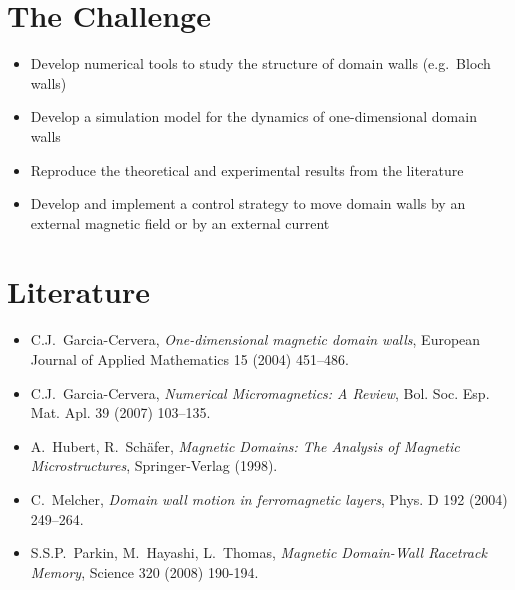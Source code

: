 \documentclass[english,pagenumoff]{rwth-document}
\begin{document}
\section*{The Challenge}
%
\begin{itemize}
\item Develop numerical tools to study the structure of domain walls (e.g.\ Bloch walls)
\item Develop a simulation model for the dynamics of one-dimensional domain walls
\item Reproduce the theoretical and experimental results from the literature
\item Develop and implement a control strategy to move domain walls by an external magnetic field or by an external current
\end{itemize}
	


\section*{Literature}
%
\begin{itemize}
\item C.J.\ Garcia-Cervera, \emph{One-dimensional magnetic domain walls}, European Journal of Applied Mathematics 15 (2004) 451--486.
\item C.J.\ Garcia-Cervera, \emph{Numerical Micromagnetics: A Review}, Bol. Soc. Esp. Mat. Apl. 39 (2007) 103--135.
\item A.\ Hubert, R.\ Sch\"afer, \emph{Magnetic Domains: The Analysis of Magnetic Microstructures}, Springer-Verlag (1998).
\item C.\ Melcher, \emph{Domain wall motion in ferromagnetic layers}, Phys. D 192 (2004) 249--264.
\item S.S.P.\ Parkin, M.\ Hayashi, L.\ Thomas, \emph{Magnetic Domain-Wall Racetrack Memory}, Science 320 (2008) 190-194.
\end{itemize}
	
\end{document}
